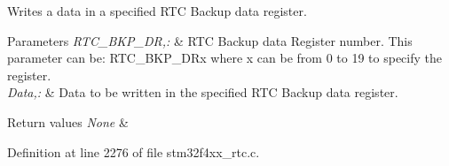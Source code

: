 Writes a data in a specified R\-T\-C Backup data register. 


\begin{DoxyParams}{Parameters}
{\em R\-T\-C\-\_\-\-B\-K\-P\-\_\-\-D\-R,\-:} & R\-T\-C Backup data Register number. This parameter can be\-: R\-T\-C\-\_\-\-B\-K\-P\-\_\-\-D\-Rx where x can be from 0 to 19 to specify the register. \\
\hline
{\em Data,\-:} & Data to be written in the specified R\-T\-C Backup data register. \\
\hline
\end{DoxyParams}

\begin{DoxyRetVals}{Return values}
{\em None} & \\
\hline
\end{DoxyRetVals}


Definition at line 2276 of file stm32f4xx\-\_\-rtc.\-c.

